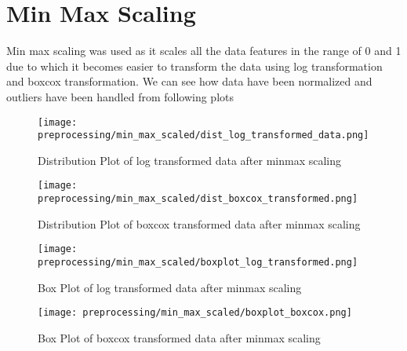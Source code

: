 \section{Min Max Scaling}
Min max scaling was used as it scales all the data features in the range of 0 and 1 due to which it becomes easier to transform the data using log transformation and boxcox transformation. We can see how data have been normalized and outliers have been handled from following plots

\begin{figure}[H]
    \centering
    \texttt{[image: preprocessing/min\_max\_scaled/dist\_log\_transformed\_data.png]}
    \caption{Distribution Plot of log transformed data after minmax scaling}
    \label{fig:Distribution Plot of log transformed data after minmax scaling}
\end{figure}

\begin{figure}[H]
    \centering
    \texttt{[image: preprocessing/min\_max\_scaled/dist\_boxcox\_transformed.png]}
    \caption{Distribution Plot of boxcox transformed data after minmax scaling}
    \label{fig:Distribution Plot of boxcox transformed data after minmax scaling}
\end{figure}

\begin{figure}[H]
    \centering
    \texttt{[image: preprocessing/min\_max\_scaled/boxplot\_log\_transformed.png]}
    \caption{Box Plot of log transformed data after minmax scaling}
    \label{fig:Box Plot of log transformed data after minmax scaling}
\end{figure}

\begin{figure}[H]
    \centering
    \texttt{[image: preprocessing/min\_max\_scaled/boxplot\_boxcox.png]}
    \caption{Box Plot of boxcox transformed data after minmax scaling}
    \label{fig:Box Plot of boxcox transformed data after minmax scaling}
\end{figure}



